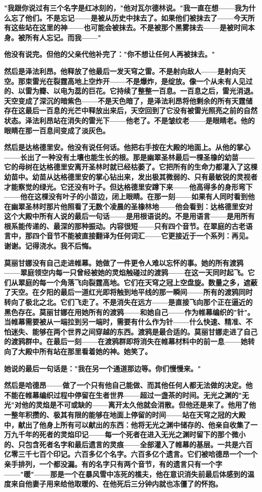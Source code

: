 \documentclass[12pt,a4paper,openany]{ctexbook}
\begin{document}
\textbf{"我跟你说过有三个名字是红冰刻的，"他对瓦尔德林说。"我一直在想——我为什么忘了他们。不是忘记——是被从历史中抹去了。如果他们被抹去了——今天所有这些站在这里的神——也可能会被抹去。不是被那个黑雾抹去——是被时间本身。被所有人忘记。而我——"}


\textbf{他没有说完。但他的父亲代他补完了："你不想让任何人再被抹去。"}


\textbf{然后是泽法利昂。他释放了他最后一发天穹之雷。不是射向敌人——是射向天空。那束雷光在裂霆高地上空炸开——不是爆炸，是绽放。像一个从未有人见过的、以雷为瓣、以电为蕊的巨花。它持续了整整一百息。一百息之后，雷光消退。天空变成了深沉的暗紫色——不是天色暗了，是泽法利昂将他剩余的所有天霆储存在这最后一百息的光芒中释放出来后，天空回到了它没有被雷光照亮之前的自然状态。泽法利昂站在消失的雷光下——他老了。不是皱纹老——是眼睛老。他的眼睛在那一百息间变成了淡灰色。}


\textbf{然后是达格德里安。他没有说任何话。他把右手按在大殿的地面上。从他的掌心——长出了一种没有土壤也能生长的根。那是幽翠圣林最后一棵圣橡的幼苗——它的母树在达格德里安离开圣林时就已经枯萎了。它把所有的生命力都灌入了这棵幼苗中。幼苗从达格德里安的掌心钻出来，发出极其微弱的、只有最敏锐的灵视者才能察觉的绿光。它还没有叶子。但达格德里安蹲下来——他高得多的身形弯下——他在这棵没有叶子的小苗边，闭上眼睛。在那一刻——如果有人同时看到他在幽翠圣林时那片他照看了无数个凌晨的圣橡林地——他会看到：达格德里安对这个大殿中所有人说的最后一句话——是用根语说的。不是用语言——是用所有根系能传递的、最深的那种振动。内容很短——只有四个音节。在翠庭的古老语言中，那四个音节不能被直接翻译为任何词汇——它更接近于一个系列：再见。谢谢。记得浇水。我不后悔。}


\textbf{莫丽甘娜没有自己走进帷幕。她做了一件更令人难以忘怀的事。她的所有渡鸦——翠庭领空内每一只曾经被她的灵焰触碰过的渡鸦——在这一天同时起飞。它们从翠庭的每一个角落飞向裂霆高地。它们在天穹之冠上空盘旋。数量之多，遮蔽了天空。在夕阳的最后一道红光即将触到地平线的那一瞬间——所有的渡鸦同时转向了极北之北。它们飞走了。不是消失在远方——是直接飞向那个正在逼近的黑色存在。莫丽甘娜在用她所有的渡鸦——和她自己——作为帷幕编织的"针"。当帷幕需要被从一端拉到另一端时，需要有什么作为针——什么快速、精准、不怕迷失、能够在两个世界之间穿越的东西。渡鸦是最合适的。莫丽甘娜走进了自己的渡鸦群中。在最后一刻——在渡鸦群即将消失在帷幕材料中的前一息——她转向了大殿中所有站在那里看着她的神。她笑了。}


\textbf{她说的最后一句话是："我在另一个通道那边等。你们慢慢来。"}


\textbf{然后是哈德昂——做了一个只有他自己能做、而其他任何人都无法做的决定。他不能在帷幕编织过程中停留在生者世界——超过一盏茶的时间。无光之渊的"无光"对他的灵焰是不可或缺的——离开太久他就会消散。但他还是来了。他用了他一整年积攒的、极其有限的能够在地面上停留的时间——站在天穹之冠的大殿中，献出了他身上所有可以献出的东西：他将无光之渊中储存的、他亲自收集了一万九千年的死者的灵焰印记——每一个死者在进入无光之渊时留下的那个微小的、只包含死者名字和最后遗言的灵痕——全部灌入了帷幕的基层。一共是六百亿零三千七百个印记。六百多亿个名字。六百多亿个遗言。它们被哈德昂一个一个亲手排列，一个都没漏。有的名字只有两个音节，有的遗言只有一个字——"暖"——那是一个在暴风雪中冻死的樵夫，他在意识消失前最后体感到的温度来自他妻子用来给他取暖的、在他死后三分钟内就也冻僵了的怀抱。}
\end{document}
